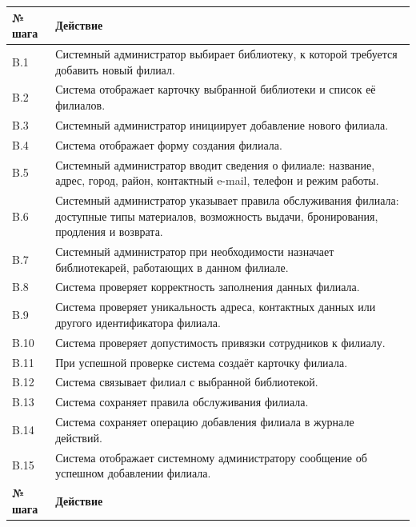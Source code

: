 \documentclass[12pt,a4paper]{article}
\begin{document}
\begin{xltabular}{\textwidth}{
				|>{\raggedright\arraybackslash}p{2.7cm}
				|>{\raggedright\arraybackslash}X|
			}
			
			\textbf{№ шага} & \textbf{Действие} \\
			\hline
			
			B.1 & Системный администратор выбирает библиотеку, к которой требуется
			добавить новый филиал. \\
			\hline
			B.2 & Система отображает карточку выбранной библиотеки и список её
			филиалов. \\
			\hline
			B.3 & Системный администратор инициирует добавление нового филиала. \\
			\hline
			B.4 & Система отображает форму создания филиала. \\
			\hline
			B.5 & Системный администратор вводит сведения о филиале: название, адрес,
			город, район, контактный e-mail, телефон и режим работы. \\
			\hline
			B.6 & Системный администратор указывает правила обслуживания филиала:
			доступные типы материалов, возможность выдачи, бронирования,
			продления и возврата. \\
			\hline
			B.7 & Системный администратор при необходимости назначает библиотекарей,
			работающих в данном филиале. \\
			\hline
			B.8 & Система проверяет корректность заполнения данных филиала. \\
			\hline
			B.9 & Система проверяет уникальность адреса, контактных данных или другого
			идентификатора филиала. \\
			\hline
			B.10 & Система проверяет допустимость привязки сотрудников к филиалу. \\
			\hline
			B.11 & При успешной проверке система создаёт карточку филиала. \\
			\hline
			B.12 & Система связывает филиал с выбранной библиотекой. \\
			\hline
			B.13 & Система сохраняет правила обслуживания филиала. \\
			\hline
			B.14 & Система сохраняет операцию добавления филиала в журнале действий. \\
			\hline
			B.15 & Система отображает системному администратору сообщение об успешном
			добавлении филиала. \\
			\hline
			
			
			\textbf{№ шага} & \textbf{Действие} \\
			\hline
			

\end{xltabular}
\end{document}
